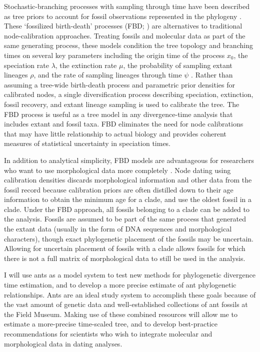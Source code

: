 \documentclass[]{article}
\begin{document}
Stochastic-branching processes with sampling through time have been described as tree priors to account for fossil observations represented in the phylogeny \citep{Heath22072014, Stadler2010396,  Didier201226, gavryushkina2015bayesian,  Zhang22102015}. These ‘fossilized birth-death’ processes (FBD; \citep{Heath22072014}) are alternatives to traditional node-calibration approaches. Treating fossils and molecular data as part of the same generating process, these models condition the tree topology and branching times on several key parameters including the origin time of the process $x_0$, the speciation rate $\lambda$, the extinction rate $\mu$, the probability of sampling extant lineages $\rho$, and the rate of sampling lineages through time $\psi$ \citep{Heath22072014, Stadler2010396}. Rather than assuming a tree-wide birth-death process and parametric prior densities for calibrated nodes, a single diversification process describing speciation, extinction, fossil recovery, and extant lineage sampling is used to calibrate the tree. The FBD process is useful as a tree model in any divergence-time analysis that includes extant and fossil taxa. FBD eliminates the need for node calibrations that may have little relationship to actual biology and provides coherent measures of statistical uncertainty in speciation times.\par
In addition to analytical simplicity, FBD models are advantageous for researchers who want to use morphological data more completely \citep{gavryushkina2015bayesian, Zhang22102015}. Node dating using calibration densities discards morphological information and other data from the fossil record because calibration priors are often distilled down to their age information to obtain the minimum age for a clade, and use the oldest fossil in a clade. Under the FBD approach, all fossils belonging to a clade can be added to the analysis. Fossils are assumed to be part of the same process that generated the extant data (usually in the form of DNA sequences and morphological characters), though exact phylogenetic placement of the fossils may be uncertain. Allowing for uncertain placement of fossils with a clade allows fossils for which there is not a full matrix of morphological data to still be used in the analysis. \par    
    I  will use ants as a model system to test new methods for phylogenetic divergence time estimation, and to develop a more precise estimate of ant phylogenetic relationships. Ants are an ideal study system to accomplish these goals because of the vast amount of genetic data and well-established collections of ant fossils at the Field Museum. Making use of these combined resources will allow me to estimate a more-precise time-scaled tree, and to develop best-practice recommendations for scientists who wish to integrate molecular and morphological data in dating analyses. \par
\end{document}
